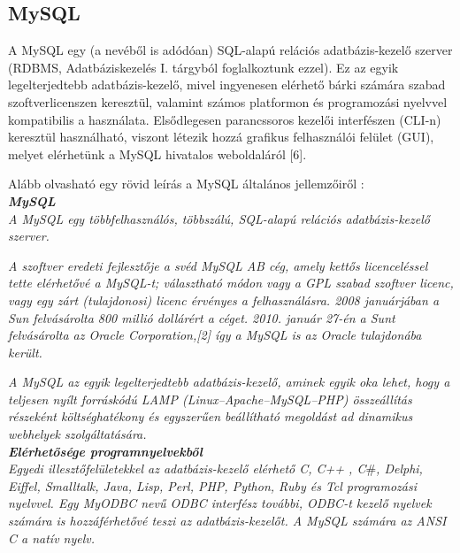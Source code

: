 
\subsection{MySQL}

A MySQL egy (a nevéből is adódóan) SQL-alapú relációs adatbázis-kezelő szerver (RDBMS, Adatbáziskezelés I. tárgyból foglalkoztunk ezzel).
Ez az egyik legelterjedtebb adatbázis-kezelő, mivel ingyenesen elérhető bárki számára szabad szoftverlicenszen keresztül, valamint számos platformon és programozási nyelvvel kompatibilis a használata.
Elsődlegesen parancssoros kezelői interfészen (CLI-n) keresztül használható, viszont létezik hozzá grafikus felhasználói felület (GUI), melyet elérhetünk a MySQL hivatalos weboldaláról [6].

Alább olvasható egy rövid leírás a MySQL általános jellemzőiről :\\

\noindent\textit{\textbf{\large{MySQL}}}\\

\textit{A MySQL egy többfelhasználós, többszálú, SQL-alapú relációs adatbázis-kezelő szerver.}

\textit{A szoftver eredeti fejlesztője a svéd MySQL AB cég, amely kettős licenceléssel tette elérhetővé a MySQL-t; választható módon vagy a GPL szabad szoftver licenc, vagy egy zárt (tulajdonosi) licenc érvényes a felhasználásra. 2008 januárjában a Sun felvásárolta 800 millió dollárért a céget. 2010. január 27-én a Sunt felvásárolta az Oracle Corporation,[2] így a MySQL is az Oracle tulajdonába került.}

\textit{A MySQL az egyik legelterjedtebb adatbázis-kezelő, aminek egyik oka lehet, hogy a teljesen nyílt forráskódú LAMP (Linux–Apache–MySQL–PHP) összeállítás részeként költséghatékony és egyszerűen beállítható megoldást ad dinamikus webhelyek szolgáltatására.}\\

\noindent\textit{\textbf{Elérhetősége programnyelvekből}}\\

\textit{Egyedi illesztőfelületekkel az adatbázis-kezelő elérhető C, C++ , C}\#\textit{, Delphi, Eiffel, Smalltalk, Java, Lisp, Perl, PHP, Python, Ruby és Tcl programozási nyelvvel. Egy MyODBC nevű ODBC interfész további, ODBC-t kezelő nyelvek számára is hozzáférhetővé teszi az adatbázis-kezelőt. A MySQL számára az ANSI C a natív nyelv.}\\

